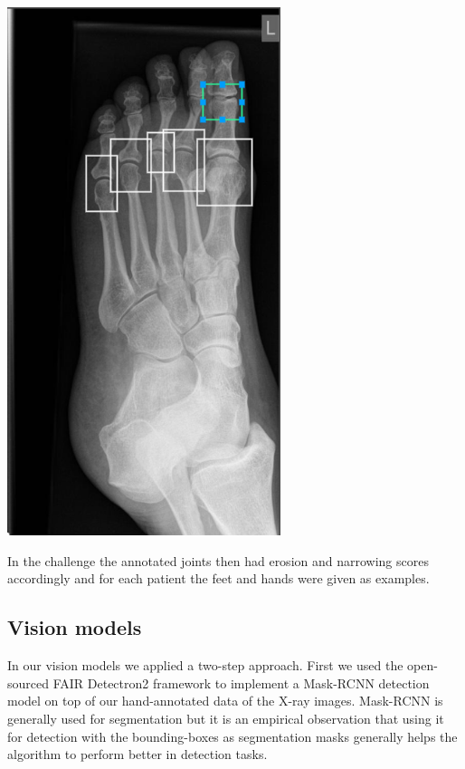 \documentclass[a4paper,12pt]{article}
\begin{document}
\begin{minipage}[t]{0.42\textwidth}
    \centering
    \includegraphics[width=0.6\textwidth]{ra/ra2-feet-annot.png}
    \label{fig:ra2-foot-annot}
\end{minipage}

\vspace{4mm}

\par In the challenge the annotated joints then had erosion and narrowing scores accordingly and for each patient the feet and hands were given as examples.

\vspace{4mm}

\subsection{Vision models}

\vspace{4mm}

\par In our vision models we applied a two-step approach. First we used the open-sourced FAIR Detectron2 \cite{wu2019detectron2} framework to implement a Mask-RCNN \cite{he2017mask} detection model on top of our hand-annotated data of the X-ray images. Mask-RCNN is generally used for segmentation but it is an empirical observation that using it for detection with the bounding-boxes as segmentation masks generally helps the algorithm to perform better in detection tasks.
\end{document}
